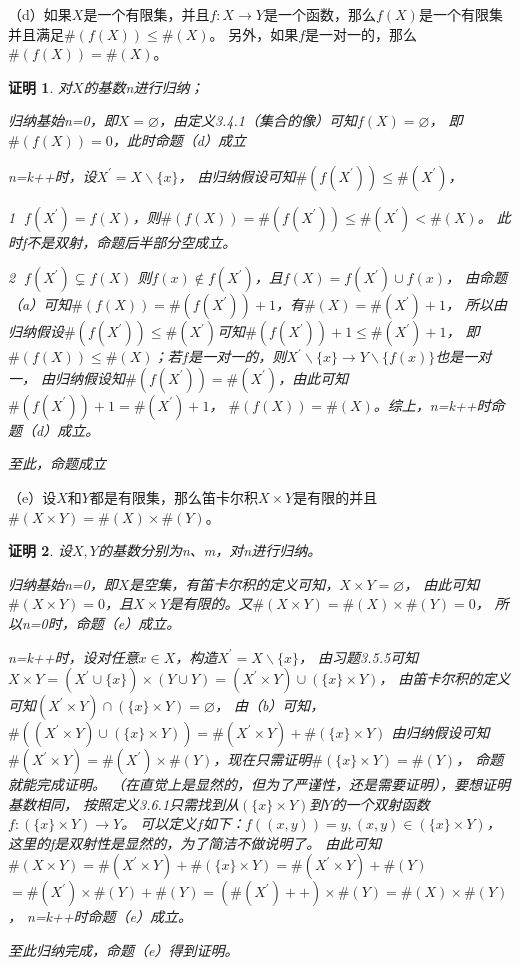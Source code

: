 \documentclass{article}
\theoremstyle{mystyle}
\theoremstyle{zproofstyle}
\newtheorem*{zproof}{证明}
\begin{document}
（d）如果$X$是一个有限集，并且$f: X \rightarrow Y$是一个函数，那么$f(X)$是一个有限集并且满足$\#(f(X)) \leq \#(X)$。
另外，如果$f$是一对一的，那么$\#(f(X)) = \#(X)$。

\begin{zproof}
    对$X$的基数n进行归纳；

    归纳基始n=0，即$X = \varnothing$，由定义3.4.1（集合的像）可知$f(X) = \varnothing$，
    即$\#(f(X)) = 0$，此时命题（d）成立
    
    n=k++时，设$X^\prime = X \backslash \{x\}$，
    由归纳假设可知$\#(f(X^\prime)) \leq \#(X^\prime)$，

    \textcircled{1} $f(X^\prime) = f(X)$，则$\#(f(X)) =\#(f(X^\prime)) \leq \#(X^\prime) < \#(X)$。
    此时f不是双射，命题后半部分空成立。

    \textcircled{2} $f(X^\prime) \subsetneq  f(X)$
    则$f(x) \not \in f(X^\prime)$，且$f(X) = f(X^\prime) \cup f(x)$，
    由命题（a）可知$\#(f(X))=\#(f(X^\prime)) + 1$，有$\#(X) = \#(X^\prime) + 1$，
    所以由归纳假设$\#(f(X^\prime)) \leq \#(X^\prime)$可知$\#(f(X^\prime)) + 1 \leq \#(X^\prime) + 1$，
    即$\#(f(X)) \leq \#(X)$；若$f$是一对一的，则$X^\prime \backslash \{x\} \rightarrow Y \backslash \{f(x)\}$也是一对一，
    由归纳假设知$\#(f(X^\prime)) = \#(X^\prime)$，由此可知$\#(f(X^\prime)) + 1 = \#(X^\prime) + 1$，
    $\#(f(X)) = \#(X)$。综上，n=k++时命题（d）成立。

    至此，命题成立
\end{zproof}

  （e）设$X$和$Y$都是有限集，那么笛卡尔积$X \times Y$是有限的并且$\#(X \times Y) = \#(X) \times \#(Y)$。
  \begin{zproof}
    设$X,Y$的基数分别为n、m，对n进行归纳。

    归纳基始n=0，即$X$是空集，有笛卡尔积的定义可知，$X \times Y = \varnothing$，
    由此可知$\#(X \times Y) = 0$，且$X \times Y$是有限的。又$\#(X \times Y) = \#(X) \times \#(Y) = 0$，
    所以n=0时，命题（e）成立。

    n=k++时，设对任意$x \in X$，构造$X^\prime = X \backslash \{x\}$，
    由习题3.5.5可知$X \times Y = (X^\prime \cup \{x\}) \times (Y \cup Y) = (X^\prime \times Y) \cup (\{x\} \times Y)$，
    由笛卡尔积的定义可知$(X^\prime \times Y) \cap (\{x\} \times Y) = \varnothing$，
    由（b）可知，$\#((X^\prime \times Y) \cup (\{x\} \times Y)) = \#(X^\prime \times Y) + \#(\{x\} \times Y)$
    由归纳假设可知$\#(X^\prime \times Y) = \#(X^\prime) \times \#(Y)$，现在只需证明$\#(\{x\} \times Y)=\#(Y)$，
    命题就能完成证明。
    （在直觉上是显然的，但为了严谨性，还是需要证明），要想证明基数相同，
    按照定义3.6.1只需找到从$(\{x\} \times Y)$到$Y$的一个双射函数$f: (\{x\} \times Y) \rightarrow Y$。
    可以定义$f$如下：$f((x,y))=y, (x,y) \in (\{x\} \times Y)$，这里的f是双射性是显然的，为了简洁不做说明了。
    由此可知$\#(X \times Y) = \#(X^\prime \times Y) + \#(\{x\} \times Y)=\#(X^\prime \times Y) + \#(Y)$
    $=\#(X^\prime) \times \#(Y) + \#(Y)=(\#(X^\prime)++) \times \#(Y) = \#(X) \times \#(Y)$，
    n=k++时命题（e）成立。

    至此归纳完成，命题（e）得到证明。

  \end{zproof}
\end{document}
